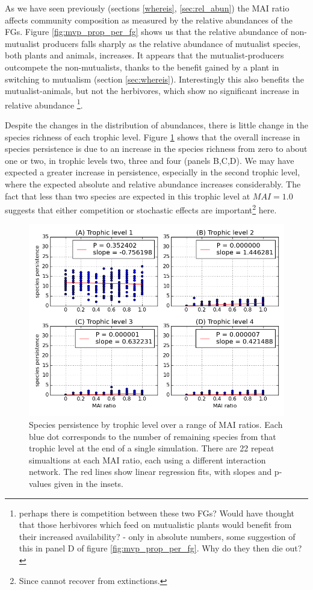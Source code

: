 As we have seen previously (sections \ref{whereis}, \ref{sec:rel_abun}) the MAI ratio affects community composition as measured by the relative abundances of the FGs. Figure \ref{fig:mvp_prop_per_fg} shows us that the relative abundance of non-mutualist producers falls sharply as the relative abundance of mutualist species, both plants and animals, increases. It appears that the mutualist-producers outcompete the non-mutualists, thanks to the benefit gained by a plant in switching to mutualism (section \ref{sec:whereis}). Interestingly this also benefits the mutualist-animals, but not the herbivores, which show no significant increase in relative abundance \footnote{perhaps there is competition between these two FGs? Would have thought that those herbivores which feed on mutualistic plants would benefit from their increased availability? - only in absolute numbers, some suggestion of this in panel D of figure \ref{fig:mvp_prop_per_fg}. Why do they then die out?}. 

Despite the changes in the distribution of abundances, there is little change in the species richness of each trophic level. Figure \ref{fig:mvp_species_per_tl} shows that the overall increase in species persistence is due to an increase in the species richness from zero to about one or two, in trophic levels two, three and four (panels B,C,D). We may have expected a greater increase in persistence, especially in the second trophic level, where the expected absolute and relative abundance increases considerably. The fact that less than two species are expected in this trophic level at $MAI = 1.0$ suggests that either competition or stochastic effects are important\footnote{Since cannot recover from extinctions.} here.    


\begin{figure}
	\centering
	\includegraphics[width=0.8\linewidth]{"figures/species_richness_per_trophic_level"}
	\caption{Species persistence by trophic level over a range of MAI ratios. Each blue dot corresponds to the number of remaining species from that trophic level at the end of a single simulation. There are 22 repeat simualtions at each MAI ratio, each using a different interaction network. The red lines show linear regression fits, with slopes and p-values given in the insets.}
	\label{fig:mvp_species_per_tl}
\end{figure}

